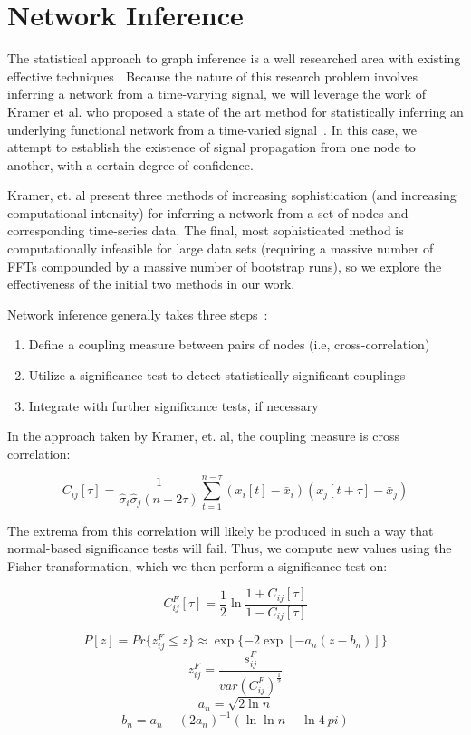 \documentclass{article} %
\begin{document}
\section{Network Inference} 
The statistical approach to graph inference is a well researched area with existing effective techniques \cite{AlbertMechanics}. Because the nature of this research problem involves inferring a network from a time-varying signal, we will leverage the work of Kramer et al. who proposed a state of the art method for statistically inferring an underlying functional network from a time-varied signal~\cite{kramer}. In this case, we attempt to establish the existence of signal propagation from one node to another, with a certain degree of confidence. 

Kramer, et. al present three methods of increasing sophistication (and increasing computational intensity) for inferring a network from a set of nodes and corresponding time-series data. The final, most sophisticated method is computationally infeasible for large data sets (requiring a massive number of FFTs compounded by a massive number of bootstrap runs), so we explore the effectiveness of the initial two methods in our work. 

Network inference generally takes three steps~\cite{kramer}:
\begin{enumerate}
\item Define a coupling measure between pairs of nodes (i.e, cross-correlation)
\item Utilize a significance test to detect statistically significant couplings
\item Integrate with further significance tests, if necessary
\end{enumerate}

In the approach taken by Kramer, et. al, the coupling measure is cross correlation:

\[ C_{ij}[\tau] = \frac{1}{\hat\sigma_i\hat\sigma_j (n-2\tau)}\sum_{t=1}^{n-\tau}(x_i[t] - \bar x_i )(x_j[t+\tau] - \bar x_j) \]

The extrema from this correlation will likely be produced in such a way that normal-based significance tests will fail. Thus, we compute new values using the Fisher transformation, which we then perform a significance test on:

\[ C_{ij}^F [\tau] = \frac{1}{2} \ln \frac{1+C_{ij}[\tau]}{1-C_{ij}[\tau]} \]

\[ P[z] = Pr\{z_{ij}^F \leq z\} \approx \exp\{-2 \exp [-a_n(z-b_n)]\} \]
\[ z_{ij}^F=\frac{s_{ij}^F}{var(C_{ij}^F)^\frac{1}{2}} \]
\[ a_n = \sqrt{2 \ln n} \]
\[ b_n = a_n - (2a_n)^{-1}(\ln \ln n + \ln 4\ pi) \]
\end{document}
